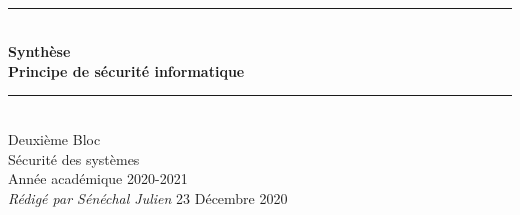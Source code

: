\documentclass[a4paper]{article}
\newcommand{\HRule}{\rule{\linewidth}{0.5mm}}
\newcommand{\bgimg}[1]{
\AddToShipoutPicture
   {
      \put(\LenToUnit{0 cm},\LenToUnit{0 cm})
      {
            \texttt{[image: \#1]} 
      }
   }
}
\begin{document}





  \begin{titlepage}
    \begin{sffamily}
    \begin{center}
      \textnormal{}\\[6.5cm]
      \HRule \\[0.4cm]
      { \Huge \bfseries Synthèse\\ Principe de sécurité informatique\\ [0.4cm] }
      \HRule \\[3cm]
      \Large
      Deuxième Bloc\\
      Sécurité des systèmes\\
      Année académique 2020-2021\\[0.2cm]
      \emph{Rédigé par Sénéchal Julien}
      \vfill
      {\large 23 Décembre 2020}
    \end{center}
    \end{sffamily}
  \end{titlepage}
\end{document}
